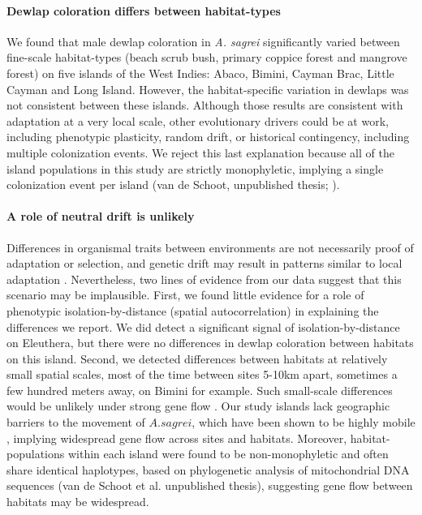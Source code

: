 

\paragraph{Dewlap coloration differs between habitat-types} We found that male dewlap coloration in \textit{A. sagrei} significantly varied between fine-scale habitat-types (beach scrub bush, primary coppice forest and mangrove forest) on five islands of the West Indies: Abaco, Bimini, Cayman Brac, Little Cayman and Long Island. However, the habitat-specific variation in dewlaps was not consistent between these islands. Although those results are consistent with adaptation at a very local scale, other evolutionary drivers could be at work, including phenotypic plasticity, random drift, or historical contingency, including multiple colonization events. We reject this last explanation because all of the island populations in this study are strictly monophyletic, implying a single colonization event per island (van de Schoot, unpublished thesis; \citealt{Driessens2017, Reynolds2020}).

\paragraph{A role of neutral drift is unlikely} Differences in organismal traits between environments are not necessarily proof of adaptation or selection, and genetic drift may result in patterns similar to local adaptation \citep{Miles2019}. Nevertheless, two lines of evidence from our data suggest that this scenario may be implausible. First, we found little evidence for a role of phenotypic isolation-by-distance (spatial autocorrelation) in explaining the differences we report. We did detect a significant signal of isolation-by-distance on Eleuthera, but there were no differences in dewlap coloration between habitats on this island. Second, we detected differences between habitats at relatively small spatial scales, most of the time between sites 5-10km apart, sometimes a few hundred meters away, on Bimini for example. Such small-scale differences would be unlikely under strong gene flow \citep{Richardson2014}. Our study islands lack geographic barriers to the movement of $A. sagrei$, which have been shown to be highly mobile \citep{Kamath2018}, implying widespread gene flow across sites and habitats. Moreover, habitat-populations within each island were found to be non-monophyletic and often share identical haplotypes, based on phylogenetic analysis of mitochondrial DNA sequences (van de Schoot et al. unpublished thesis), suggesting gene flow between habitats may be widespread.\\

